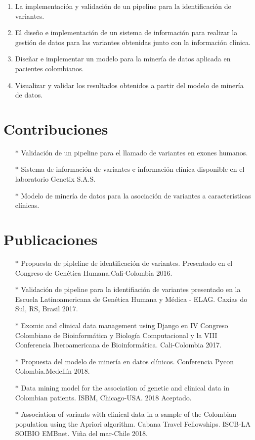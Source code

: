 \begin{enumerate}  
	\item La implementación y validación de un pipeline para la identificación de variantes.
	\item El diseño e implementación de un sistema de información para realizar la gestión de datos para las variantes obtenidas junto con la información clínica.
	\item Diseñar e implementar un modelo para la  minería de datos aplicada en pacientes colombianos.
	\item Visualizar y validar los resultados  obtenidos a partir del modelo de minería de datos.
\end{enumerate}

\section*{Contribuciones}

\begin{itemize}
	\item[$*$] Validación de un pipeline para el llamado de variantes en exones humanos. 
	\item[$*$] Sistema de información de variantes e información clínica  disponible en el laboratorio Genetix S.A.S.
	\item[$*$] Modelo de minería de datos para la asociación de variantes a caracteristicas clínicas. 

\end{itemize}

\section*{Publicaciones}
\begin{itemize}
	\item[$*$] Propuesta de pipleline de identificación de variantes. Presentado en el Congreso de Genética Humana.Cali-Colombia 2016.
	\item[$*$] Validación de pipeline para la identifiación de variantes presentado en la Escuela Latinoamericana de Genética Humana y Médica - ELAG. Caxias do Sul, RS, Brasil 2017.
	\item[$*$] Exomic and clinical data management using Django en IV Congreso Colombiano de Bioinformática y Biología Computacional y la VIII Conferencia Iberoamericana de Bioinformática. Cali-Colombia 2017.
	\item[$*$] Propuesta del  modelo de minería en datos clínicos. Conferencia Pycon Colombia.Medellín 2018.
	\item[$*$] Data mining model for the association of genetic and clinical data in Colombian patients.  ISBM, Chicago-USA. 2018 Aceptado. 
	\item[$*$] Association of variants with clinical data in a sample of the Colombian population using the Apriori algorithm. Cabana Travel Fellowships. ISCB-LA SOIBIO EMBnet. Viña del mar-Chile 2018. 	
\end{itemize}
	

